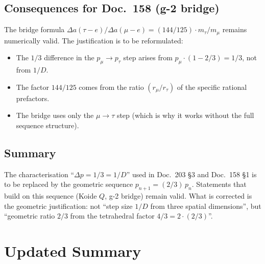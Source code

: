 \subsection*{Consequences for Doc.~158 (g-2 bridge)}

The bridge formula
$\Delta a(\tau{-}e)/\Delta a(\mu{-}e) = (144/125) \cdot m_\tau/m_\mu$
remains numerically valid. The justification is to be reformulated:
\begin{itemize}[leftmargin=2em,itemsep=2pt,topsep=2pt]
  \item The $1/3$ difference in the $p_\mu \to p_\tau$ step arises
        from $p_\mu \cdot (1 - 2/3) = 1/3$, not from $1/D$.
  \item The factor $144/125$ comes from the ratio
        $(r_\mu/r_\tau)$ of the specific rational prefactors.
  \item The bridge uses only the $\mu \to \tau$ step (which is why
        it works without the full sequence structure).
\end{itemize}

\subsection*{Summary}

The characterisation \enquote{$\Delta p = 1/3 = 1/D$} used in
Doc.~203 §3 and Doc.~158 §1 is to be replaced by the geometric
sequence $p_{n+1} = (2/3)\,p_n$. Statements that build on this
sequence (Koide $Q$, g-2 bridge) remain valid. What is corrected is
the geometric justification: not \enquote{step size $1/D$ from three
spatial dimensions}, but \enquote{geometric ratio $2/3$ from the
tetrahedral factor $4/3 = 2\cdot(2/3)$}.

\section*{Updated Summary}

